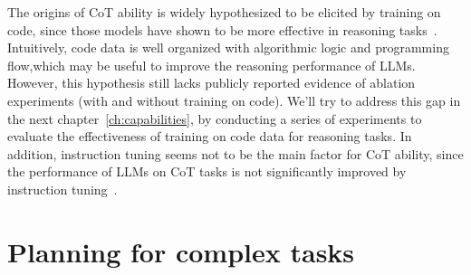 The origins of CoT ability is widely hypothesized to be elicited by training on code, since those models have shown to be more effective in reasoning tasks~\cite{fu2022gptroadmap, liang2022holistic}.
Intuitively, code data is well organized with algorithmic logic and programming flow,which may be useful to improve the reasoning performance of LLMs. However, this hypothesis still lacks publicly reported evidence of ablation experiments (with and without training on code).
We'll try to address this gap in the next chapter~\ref{ch:capabilities}, by conducting a series of experiments to evaluate the effectiveness of training on code data for reasoning tasks.
In addition, instruction tuning seems not to be the main factor for CoT ability, since the performance of LLMs on CoT tasks is not significantly improved by instruction tuning~\cite{chung2022scaling}.

\section{Planning for complex tasks}
\label{sec:planning}


